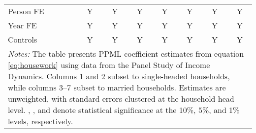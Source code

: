 {\begin{tabular}{l*{7}{c}}
Person FE           &           Y         &           Y         &           Y         &           Y         &           Y         &           Y         &           Y         \\
Year FE             &           Y         &           Y         &           Y         &           Y         &           Y         &           Y         &           Y         \\
Controls            &           Y         &           Y         &           Y         &           Y         &           Y         &           Y         &           Y         \\
\bottomrule
\multicolumn{8}{p{16cm}}{\footnotesize \textit{Notes:} The table presents PPML coefficient estimates from equation \ref{eq:housework} using data from the Panel Study of Income Dynamics. Columns 1 and 2 subset to single-headed households, while columns 3--7 subset to married households. Estimates are unweighted, with standard errors clustered at the household-head level. \sym{*}, \sym{**}, and \sym{***} denote statistical significance at the 10\%, 5\%, and 1\% levels, respectively.}\\
\end{tabular}
}
